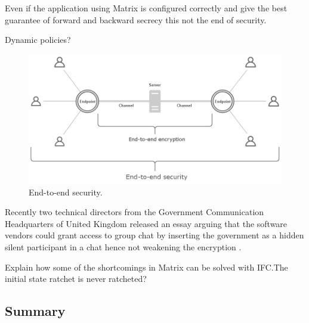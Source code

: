 Even if the application using Matrix is configured correctly and give the best guarantee of forward and backward secrecy this not the end of security. 

Dynamic policies?


\begin{figure}[H]
	\centering
	\includegraphics[width=12cm]{figures/e2esecurity.png}
	\caption{End-to-end security.}
	\label{fig:e2esecurity}
\end{figure}


Recently two technical directors from the Government Communication Headquarters of United Kingdom released an essay arguing that the software vendors could grant access to group chat by inserting the government as a hidden silent participant in a chat hence not weakening the encryption \cite{gchq}.


Explain how some of the shortcomings in Matrix can be solved with IFC.The initial state ratchet is never ratcheted?

\subsection{Summary}










